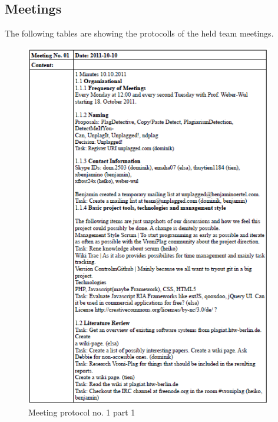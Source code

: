
\begin{appendix}

\chapter{Meetings}\label{ch:Meetings}
The following tables are showing the protocolls of the held team meetings.

\begin{figure}
  \centering
    \includegraphics[width=0.97\textwidth]{images/a_meetings/meeting_01a.png}
  \caption{Meeting protocol no. 1 part 1}
  \label{fig:meeting protocol no. 1 part 1}
\end{figure}


\end{appendix}
